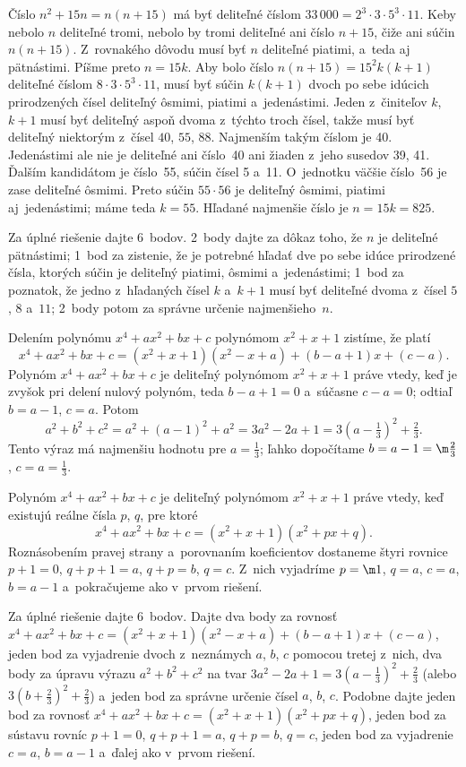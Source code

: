 {%
Číslo $n^{2}+15n=n(n+15)$ má byť deliteľné číslom $33\,000=2^3\cdot3\cdot5^3\cdot11$. Keby nebolo $n$ deliteľné tromi, nebolo by tromi deliteľné ani číslo $n+15$, čiže ani súčin $n(n+15)$. Z~rovnakého dôvodu musí byť $n$ deliteľné piatimi, a~teda aj pätnástimi. Píšme preto $n=15k$. Aby bolo číslo $n(n+15)=15^2k(k+1)$ deliteľné číslom 
$8\cdot3\cdot5^3\cdot11$, musí byť súčin $k(k+1)$ dvoch po sebe idúcich prirodzených čísel deliteľný ôsmimi, piatimi a~jedenástimi. Jeden z~činiteľov $k$, $k+1$ musí byť deliteľný aspoň dvoma z~týchto troch čísel, takže musí byť deliteľný niektorým z~čísel $40$, $55$, $88$. Najmenším takým číslom je 40. Jedenástimi ale nie je deliteľné ani číslo~40 ani žiaden z~jeho susedov 39, 41. Ďalším kandidátom je číslo~55, súčin čísel 5 a~11. O~jednotku väčšie číslo~56 je zase deliteľné ôsmimi. Preto súčin $55\cdot56$ je deliteľný ôsmimi, piatimi aj~jedenástimi; máme teda $k=55$. 
Hľadané najmenšie číslo je $n=15k=825$.

\nobreak\medskip\petit\noindent
Za úplné riešenie dajte 6~bodov.
2~body dajte za dôkaz toho, že $n$ je deliteľné pätnástimi; 1~bod za zistenie, že je potrebné hľadať dve po sebe idúce prirodzené čísla, ktorých súčin je deliteľný piatimi, ôsmimi a~jedenástimi; 1~bod za poznatok, že jedno z~hľadaných čísel $k$ a~$k+1$ musí byť deliteľné dvoma z~čísel $5$, $8$ a~$11$; 2~body potom za správne určenie najmenšieho~$n$.
\endpetit
\bigbreak 
}

{%
Delením polynómu $x^4+ax^2+bx+c$ polynómom $x^2+x+1$ zistíme, že platí
$$
x^4+ax^2+bx+c=(x^2+x+1)(x^2-x+a)+(b-a+1)x+(c-a).
$$
Polynóm $x^4+ax^2+bx+c$ je deliteľný polynómom $x^2+x+1$ práve vtedy, keď je zvyšok pri delení nulový polynóm, teda $b-a+1=0$ a~súčasne $c-a=0$; odtiaľ $b=a-1$, $c=a$.
Potom
$$
a^2+b^2+c^2=a^2+(a-1)^2+a^2=3a^2-2a+1=3\left(a-\tfrac13\right)^2+\tfrac23.
$$
Tento výraz má najmenšiu hodnotu pre $a=\frac13$; ľahko dopočítame $b=a-1=\m\frac23$, $c=a=\frac13$.

\ineriesenie 
Polynóm $x^4+ax^2+bx+c$ je deliteľný polynómom $x^2+x+1$ práve vtedy, keď existujú reálne čísla $p$, $q$, pre ktoré 
$$
x^4+ax^2+bx+c=(x^2+x+1)(x^2+px+q).
$$
Roznásobením pravej strany a~porovnaním koeficientov dostaneme štyri rovnice $p+1=0$, $q+p+1=a$, $q+p=b$, $q=c$. Z~nich vyjadríme $p=\m1$, $q=a$, $c=a$, $b=a-1$ a~pokračujeme ako v~prvom riešení.

\nobreak\medskip\petit\noindent
Za úplné riešenie dajte 6~bodov.
Dajte dva body za rovnosť $x^4+ax^2+bx+c=(x^2+x+1)(x^2-x+a)+(b-a+1)x+(c-a)$, jeden bod za vyjadrenie dvoch z~neznámych $a$, $b$, $c$ pomocou tretej z~nich, dva body za úpravu výrazu $a^2+b^2+c^2$ na tvar $3a^2-2a+1=3\left(a-\frac13\right)^2+\frac23$ (alebo $3\left(b+\frac23\right)^2+\frac23$) a~jeden bod za správne určenie čísel $a$, $b$, $c$.
Podobne dajte jeden bod za rovnosť $x^4+ax^2+bx+c=(x^2+x+1)(x^2+px+q)$, jeden bod za sústavu rovníc $p+1=0$, $q+p+1=a$, $q+p=b$, $q=c$, jeden bod za vyjadrenie $c=a$, $b=a-1$ a~ďalej ako v~prvom riešení.
\endpetit
\bigbreak
}

